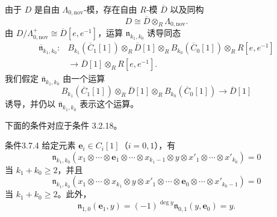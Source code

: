 由于 $D$ 是自由 $\Lambda_{0,\mathrm{nov}}$-模，存在自由 $R$-模
$\overline D$ 以及同构
\[
  D\cong\overline D\otimes_R\Lambda_{0,\mathrm{nov}}.
\]
由
$D/\Lambda^+_{0,\mathrm{nov}}\cong\overline D[e,e^{-1}]$，运算
$\mathfrak n_{k_1,k_0}$ 诱导同态
\[
\begin{aligned}
\overline{\mathfrak n}_{k_1,k_0}\colon{}
&B_{k_1}(\overline C_1[1])\otimes_R\overline D[1]
 \otimes_RB_{k_0}(\overline C_0[1])\otimes_RR[e,e^{-1}]\\
&\longrightarrow\overline D[1]\otimes_RR[e,e^{-1}].
\end{aligned}
\]
我们假定 $\overline{\mathfrak n}_{k_1,k_0}$ 由一个运算
\[
  B_{k_1}(\overline C_1[1])\otimes_R\overline D[1]
  \otimes_RB_{k_0}(\overline C_0[1])
  \longrightarrow\overline D[1]
\]
诱导，并仍以 $\overline{\mathfrak n}_{k_1,k_0}$ 表示这个运算。

下面的条件对应于条件 3.2.18。

\begin{statement}{条件}{3.7.4}\label{cond:3-7-4}
给定元素 $\mathbf e_i\in C_i[1]$（$i=0,1$），有
\begin{equation}
\mathfrak n_{k_1,k_0}
(x_1\otimes\cdots\otimes\mathbf e_1\otimes\cdots\otimes x_{k_1-1}
 \otimes y\otimes x'_1\otimes\cdots\otimes x'_{k_0})=0
\tag{3.7.4.1}\label{eq:3-7-4-1}
\end{equation}
当 $k_1+k_0\geq2$，并且
\begin{equation}
\mathfrak n_{k_1,k_0}
(x_1\otimes\cdots\otimes x_{k_1}\otimes y
 \otimes x'_1\otimes\cdots\otimes\mathbf e_0\otimes\cdots
 \otimes x'_{k_0-1})=0
\tag{3.7.4.2}\label{eq:3-7-4-2}
\end{equation}
当 $k_1+k_0\geq2$。此外，
\begin{equation}
  \mathfrak n_{1,0}(\mathbf e_1,y)
  =(-1)^{\deg y}\mathfrak n_{0,1}(y,\mathbf e_0)=y.
\tag{3.7.4.3}\label{eq:3-7-4-3}
\end{equation}
\end{statement}

